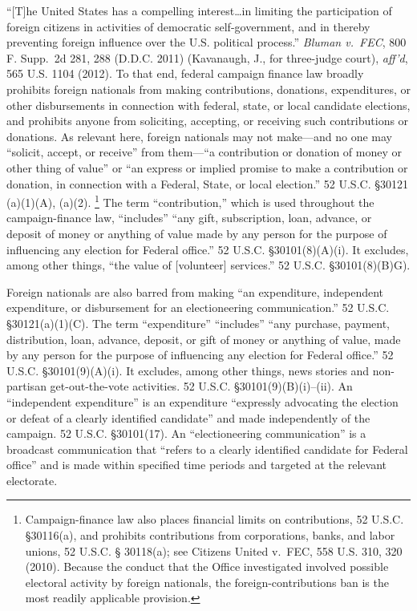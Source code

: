 ``[T]he United States has a compelling interest\dots in limiting the participation of foreign citizens in activities of democratic self-government, and in thereby preventing foreign influence over the U.S. political process.''
\textit{Bluman v.\ FEC}, 800 F. Supp.~2d 281, 288 (D.D.C. 2011) (Kavanaugh, J., for three-judge court), \textit{aff'd}, 565 U.S. 1104 (2012).
To that end, federal campaign finance law broadly prohibits foreign nationals from making contributions, donations, expenditures, or other disbursements in connection with federal, state, or local candidate elections, and prohibits anyone from soliciting, accepting, or receiving such contributions or donations.
As relevant here, foreign nationals may not make---and no one may ``solicit, accept, or receive'' from them---``a contribution or donation of money or other thing of value'' or ``an express or implied promise to make a contribution or donation, in connection with a Federal, State, or local election.''
52 U.S.C. \S 30121 (a)(1)(A), (a)(2).%
\footnote{Campaign-finance law also places financial limits on contributions, 52 U.S.C. \S 30116(a), and prohibits contributions from corporations, banks, and labor unions, 52 U.S.C. § 30118(a);
see Citizens United v.\ FEC, 558 U.S. 310, 320 (2010).
Because the conduct that the Office investigated involved possible electoral activity by foreign nationals, the foreign-contributions ban is the most readily applicable provision.}
The term ``contribution,'' which is used throughout the campaign-finance law, ``includes'' ``any gift, subscription, loan, advance, or deposit of money or anything of value made by any person for the purpose of influencing any election for Federal office.''
52 U.S.C. \S 30101(8)(A)(i).
It excludes, among other things, ``the value of [volunteer] services.'' 52 U.S.C. \S 30101(8)(B)G).

Foreign nationals are also barred from making ``an expenditure, independent expenditure, or disbursement for an electioneering communication.''
52 U.S.C. \S 30121(a)(1)(C).
The term ``expenditure'' ``includes'' ``any purchase, payment, distribution, loan, advance, deposit, or gift of money or anything of value, made by any person for the purpose of influencing any election for Federal office.''
52 U.S.C. \S 30101(9)(A)(i).
It excludes, among other things, news stories and non-partisan get-out-the-vote activities.
52 U.S.C. \S 30101(9)(B)(i)--(ii).
An ``independent expenditure'' is an expenditure ``expressly advocating the election or defeat of a clearly identified candidate'' and made independently of the campaign.
52 U.S.C. \S 30101(17).
An ``electioneering communication'' is a broadcast communication that ``refers to a clearly identified candidate for Federal office'' and is made within specified time periods and targeted at the relevant electorate.

